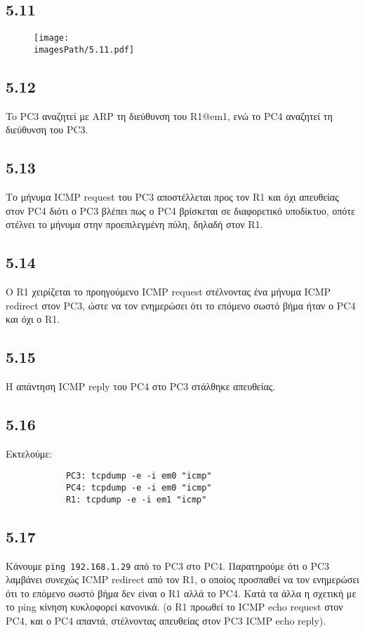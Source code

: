 \documentclass[a4paper, 12pt]{article}
\newcommand{\imagesPath}{.}
\begin{document}
	\subsection*{5.11}
		\begin{figure}[H]
			\texttt{[image: \\imagesPath/5.11.pdf]}
		\end{figure}

	\subsection*{5.12}
		To PC3 αναζητεί με ARP τη διεύθυνση του R1@em1, ενώ το PC4 αναζητεί τη διεύθυνση του PC3.

	\subsection*{5.13}
		Το μήνυμα ICMP request του PC3 αποστέλλεται προς τον R1 και όχι απευθείας στον PC4 διότι ο PC3 βλέπει πως ο PC4 βρίσκεται σε διαφορετικό υποδίκτυο, οπότε στέλνει το μήνυμα στην προεπιλεγμένη πύλη, δηλαδή στον R1.

	\subsection*{5.14}
		Ο R1 χειρίζεται το προηγούμενο ICMP request στέλνοντας ένα μήνυμα ICMP redirect στον PC3, ώστε να τον ενημερώσει ότι το επόμενο σωστό βήμα ήταν ο PC4 και όχι ο R1. 

	\subsection*{5.15}
		Η απάντηση ICMP reply του PC4 στο PC3 στάλθηκε απευθείας.

	\subsection*{5.16}
		Εκτελούμε: 
		
		\begin{verbatim}
			PC3: tcpdump -e -i em0 "icmp"
			PC4: tcpdump -e -i em0 "icmp"
			R1: tcpdump -e -i em1 "icmp"
		\end{verbatim}

	\subsection*{5.17}
		Κάνουμε \verb|ping 192.168.1.29| από το PC3 στο PC4. Παρατηρούμε ότι ο PC3 λαμβάνει συνεχώς ICMP redirect από τον R1, ο οποίος προσπαθεί να τον ενημερώσει ότι το επόμενο σωστό βήμα δεν είναι ο R1 αλλά το PC4. Κατά τα άλλα η σχετική με το ping κίνηση κυκλοφορεί κανονικά. (ο R1 προωθεί το ICMP echo request στον PC4, και ο PC4 απαντά, στέλνοντας απευθείας στον PC3 ICMP echo reply).
\end{document}
